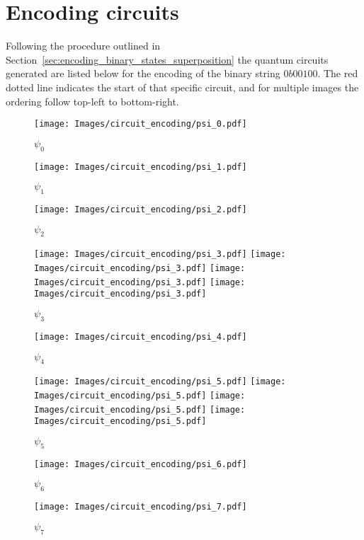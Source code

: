 \section{Encoding circuits}\label{app:circuits}
Following the procedure outlined in Section~\ref{sec:encoding_binary_states_superposition} the quantum circuits generated are listed below for the encoding of the binary string $0b00100$. The red dotted line indicates the start of that specific circuit, and for multiple images the ordering follow top-left to bottom-right.

\begin{figure}[h!]
    \centering
    \texttt{[image: Images/circuit\_encoding/psi\_0.pdf]}
    \caption[]{$\psi_0$}
\end{figure}

\begin{figure}[h!]
    \centering
    \texttt{[image: Images/circuit\_encoding/psi\_1.pdf]}
    \caption[]{$\psi_1$}
\end{figure}

\begin{figure}[h!]
    \centering
    \texttt{[image: Images/circuit\_encoding/psi\_2.pdf]}
    \caption[]{$\psi_2$}
\end{figure}

\begin{figure}[h!]
    \centering
    \texttt{[image: Images/circuit\_encoding/psi\_3.pdf]}
    \texttt{[image: Images/circuit\_encoding/psi\_3.pdf]}
    \texttt{[image: Images/circuit\_encoding/psi\_3.pdf]}
    \texttt{[image: Images/circuit\_encoding/psi\_3.pdf]}
    \caption[]{$\psi_3$}
\end{figure}

\begin{figure}[h!]
    \centering
    \texttt{[image: Images/circuit\_encoding/psi\_4.pdf]}
    \caption[]{$\psi_4$}
\end{figure}

\begin{figure}[h!]
    \centering
    \texttt{[image: Images/circuit\_encoding/psi\_5.pdf]}
    \texttt{[image: Images/circuit\_encoding/psi\_5.pdf]}
    \texttt{[image: Images/circuit\_encoding/psi\_5.pdf]}
    \texttt{[image: Images/circuit\_encoding/psi\_5.pdf]}
    \caption[]{$\psi_5$}
\end{figure}

\begin{figure}[h!]
    \centering
    \texttt{[image: Images/circuit\_encoding/psi\_6.pdf]}
    \caption[]{$\psi_6$}
\end{figure}

\begin{figure}[h!]
    \centering
    \texttt{[image: Images/circuit\_encoding/psi\_7.pdf]}
    \caption[]{$\psi_7$}
\end{figure}
\clearpage